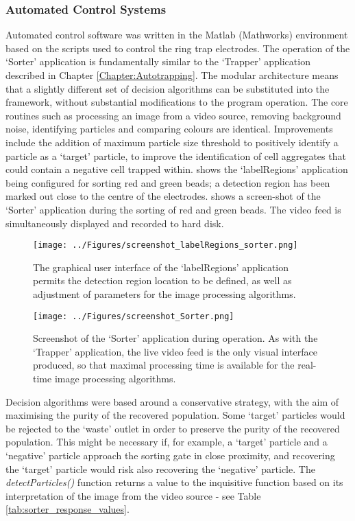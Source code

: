 \subsubsection{Automated Control Systems}
Automated control software was written in the Matlab (Mathworks) environment based on the scripts used to control the ring trap electrodes. The operation of the `Sorter' application is fundamentally similar to the `Trapper' application described in Chapter \ref{Chapter:Autotrapping}. The modular architecture means that a slightly different set of decision algorithms can be substituted into the framework, without substantial modifications to the program operation. The core routines such as processing an image from a video source, removing background noise, identifying particles and comparing colours are identical. Improvements include the addition of maximum particle size threshold to positively identify a particle as a `target' particle, to improve the identification of cell aggregates that could contain a negative cell trapped within.  shows the `labelRegions' application being configured for sorting red and green beads; a detection region has been marked out close to the centre of the electrodes.  shows a screen-shot of the `Sorter' application during the sorting of red and green beads. The video feed is simultaneously displayed and recorded to hard disk.

\begin{figure}[p]
	\centering
		\texttt{[image: ../Figures/screenshot\_labelRegions\_sorter.png]}
	\caption[Screenshot of the `labelRegions' application during operation.]{The graphical user interface of the `labelRegions' application permits the detection region location to be defined, as well as adjustment of parameters for the image processing algorithms.}
	\label{fig:screenshot_labelRegions_sorter}
\end{figure}

\begin{figure}[p]
	\centering
		\texttt{[image: ../Figures/screenshot\_Sorter.png]}
	\caption[Screenshot of the `Sorter' application during operation.]{Screenshot of the `Sorter' application during operation. As with the `Trapper' application, the live video feed is the only visual interface produced, so that maximal processing time is available for the real-time image processing algorithms.}
	\label{fig:screenshot_Sorter}
\end{figure}

Decision algorithms were based around a conservative strategy, with the aim of maximising the purity of the recovered population. Some `target' particles would be rejected to the `waste' outlet in order to preserve the purity of the recovered population. This might be necessary if, for example, a `target' particle and a `negative' particle approach the sorting gate in close proximity, and recovering the `target' particle would risk also recovering the `negative' particle. The \textit{detectParticles()} function returns a value to the inquisitive function based on its interpretation of the image from the video source - see Table \ref{tab:sorter_response_values}.


